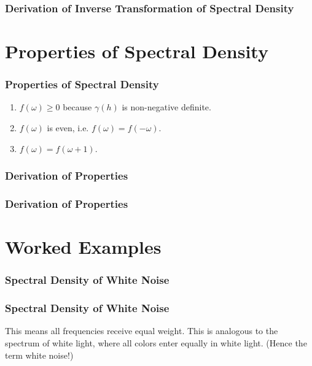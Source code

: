 \documentclass[%
xcolor=pdftex]{beamer}
\begin{document}
\begin{frame}
\frametitle{Derivation of Inverse Transformation of Spectral Density}



\end{frame}



\section{Properties of Spectral Density}
\frame{\tableofcontents[currentsection]}

\begin{frame}
\frametitle{Properties of Spectral Density}

\begin{enumerate}
\item $f(\omega) \geq 0$ because $\gamma(h)$ is non-negative definite.
\item $f(\omega)$ is even, i.e. $f(\omega) = f(-\omega)$.
\item $f(\omega) = f(\omega+1)$.
\end{enumerate}



\end{frame}

\begin{frame}
\frametitle{Derivation of Properties}



\end{frame}

\begin{frame}
\frametitle{Derivation of Properties}



\end{frame}



\section{Worked Examples}
\frame{\tableofcontents[currentsection]}



\begin{frame}
\frametitle{Spectral Density of White Noise}



\end{frame}

\begin{frame}
\frametitle{Spectral Density of White Noise}

This means all frequencies receive equal weight. This is analogous to the spectrum of white light, where all colors enter equally in white light. (Hence the term white noise!)


\end{frame}
\end{document}
